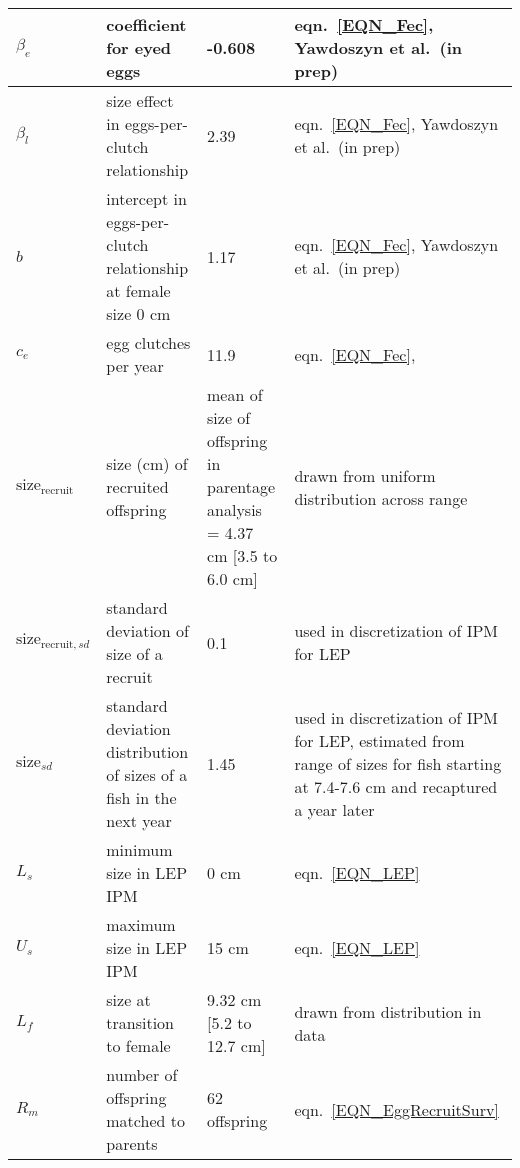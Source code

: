 \documentclass[12pt, oneside]{article}   	%
\begin{document}
\begin{landscape}
\begin{longtable}{|p{1.1in}|p{1.5in}|p{1.5in}|p{1.8in}|}
$\beta_e$ & coefficient for eyed eggs & -0.608 & eqn.\ \ref{EQN_Fec}, Yawdoszyn et al.\ (in prep) \\ \hline
$\beta_l$ & size effect in eggs-per-clutch relationship & 2.39 & eqn.\ \ref{EQN_Fec}, Yawdoszyn et al.\ (in prep) \\ \hline
$b$ & intercept in eggs-per-clutch relationship at female size 0 cm & 1.17 & eqn.\ \ref{EQN_Fec}, Yawdoszyn et al.\ (in prep) \\ \hline
$c_e$ & egg clutches per year & 11.9 & eqn.\ \ref{EQN_Fec}, \cite{holtswarth2017fecundity} \\ \hline
$\text{size}_\text{recruit}$ & size (cm) of recruited offspring & mean of size of offspring in parentage analysis = 4.37 cm [3.5 to 6.0 cm] & drawn from uniform distribution across range \\ \hline
$\text{size}_{\text{recruit}, sd}$ & standard deviation of size of a recruit & 0.1 & used in discretization of IPM for LEP \\ \hline
$\text{size}_{sd}$ & standard deviation distribution of sizes of a fish in the next year & 1.45 & used in discretization of IPM for LEP, estimated from range of sizes for fish starting at 7.4-7.6 cm and recaptured a year later \\ \hline
$L_s$ & minimum size in LEP IPM & 0 cm & eqn.\ \ref{EQN_LEP} \\ \hline
$U_s$ & maximum size in LEP IPM & 15 cm & eqn.\ \ref{EQN_LEP} \\ \hline
$L_f$ & size at transition to female & 9.32 cm [5.2 to 12.7 cm] & drawn from distribution in data \\ \hline
$R_m$ & number of offspring matched to parents & 62	offspring & eqn.\ \ref{EQN_EggRecruitSurv} \\ \hline

\end{longtable}
\end{landscape}
\end{document}
